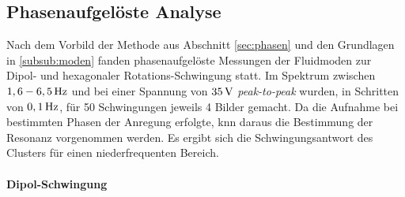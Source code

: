 \documentclass[numbers=noenddot,a4paper,notitlepage,twoside,BCOR15mm]{scrbook}
\newcommand{\tilt}[1]{\textit{#1}}
\begin{document}
				\subsection{Phasenaufgelöste Analyse}\label{subsec:phasenanal}

					Nach dem Vorbild der Methode aus Abschnitt \ref{sec:phasen} und den Grundlagen in \ref{subsub:moden} fanden phasenaufgelöste Messungen der Fluidmoden zur Dipol- und hexagonaler Rotations-Schwingung statt. Im Spektrum zwischen $\unit[1,6-6,5]{Hz}$ und bei einer Spannung von $\unit[35]{V}$ \tilt{peak-to-peak} wurden, in Schritten von $\unit[0,1]{Hz}$, für 50 Schwingungen jeweils 4 Bilder gemacht. Da die Aufnahme bei bestimmten Phasen der Anregung erfolgte, knn daraus die Bestimmung der Resonanz vorgenommen werden. Es ergibt sich die Schwingungsantwort des Clusters für einen niederfrequenten Bereich.

					\paragraph{Dipol-Schwingung}
					
\end{document}
